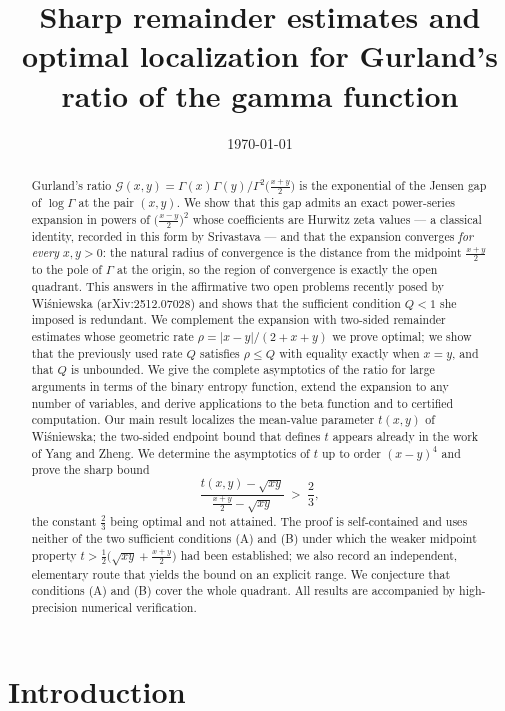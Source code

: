 \documentclass[11pt,a4paper]{amsart}
\title[Sharp remainders and optimal localization for Gurland's ratio]{Sharp remainder
estimates and optimal localization for Gurland's ratio of the gamma function}
\author{}
\date{\today}
\theoremstyle{definition}
\newcommand{\Gg}{\mathcal{G}}
\begin{document}
\begin{abstract}
Gurland's ratio $\Gg(x,y)=\Gamma(x)\Gamma(y)/\Gamma^{2}\big(\tfrac{x+y}{2}\big)$ is the
exponential of the Jensen gap of $\log\Gamma$ at the pair $(x,y)$. We show that this gap
admits an exact power-series expansion in powers of $\big(\tfrac{x-y}{2}\big)^{2}$ whose
coefficients are Hurwitz zeta values --- a classical identity, recorded in this form by
Srivastava --- and that the expansion converges \emph{for every} $x,y>0$: the natural
radius of convergence is the distance from the midpoint
$\tfrac{x+y}{2}$ to the pole of $\Gamma$ at the origin, so the region of convergence is
exactly the open quadrant. This answers in the affirmative two open problems recently posed
by Wi\'sniewska (arXiv:2512.07028) and shows that the sufficient condition $Q<1$ she imposed
is redundant. We complement the expansion with two-sided remainder estimates whose
geometric rate $\rho=|x-y|/(2+x+y)$ we prove optimal; we show that the previously used rate
$Q$ satisfies $\rho\le Q$ with equality exactly when $x=y$, and that $Q$ is unbounded. We
give the complete asymptotics of the ratio for large arguments in terms of the binary
entropy function, extend the expansion to any number of variables, and derive applications
to the beta function and to certified computation. Our main result localizes the
mean-value parameter $t(x,y)$ of Wi\'sniewska; the two-sided endpoint bound that defines
$t$ appears already in the work of Yang and Zheng. We determine the asymptotics of $t$ up
to order $(x-y)^{4}$ and prove the sharp bound
\[
  \frac{t(x,y)-\sqrt{xy}}{\frac{x+y}{2}-\sqrt{xy}}\;>\;\frac{2}{3},
\]
the constant $\tfrac23$ being optimal and not attained. The proof is self-contained and
uses neither of the two sufficient conditions (A) and (B) under which the weaker midpoint
property $t>\tfrac12\big(\sqrt{xy}+\tfrac{x+y}{2}\big)$ had been established; we also
record an independent, elementary route that yields the bound on an explicit range. We
conjecture that conditions (A) and (B) cover the whole quadrant. All results are
accompanied by high-precision numerical verification.
\end{abstract}

\maketitle

\section{Introduction}
\end{document}
